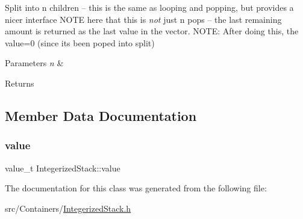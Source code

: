 Split into n children -- this is the same as looping and popping, but provides a nicer interface N\+O\+TE here that this is {\itshape not} just n pops -- the last remaining amount is returned as the last value in the vector. N\+O\+TE\+: After doing this, the value=0 (since it\textquotesingle{}s been poped into split) 


\begin{DoxyParams}{Parameters}
{\em n} & \\
\hline
\end{DoxyParams}
\begin{DoxyReturn}{Returns}

\end{DoxyReturn}


\subsection{Member Data Documentation}
\mbox{\label{class_integerized_stack_afcfb2d32d51c88b556f3bb7ff2544be5}} 
\subsubsection{\texorpdfstring{value}{value}}
{\footnotesize\ttfamily value\+\_\+t Integerized\+Stack\+::value\hspace{0.3cm}{\ttfamily [protected]}}



The documentation for this class was generated from the following file\+:\begin{DoxyCompactItemize}
\item 
src/\+Containers/\hyperlink{_integerized_stack_8h}{Integerized\+Stack.\+h}\end{DoxyCompactItemize}
